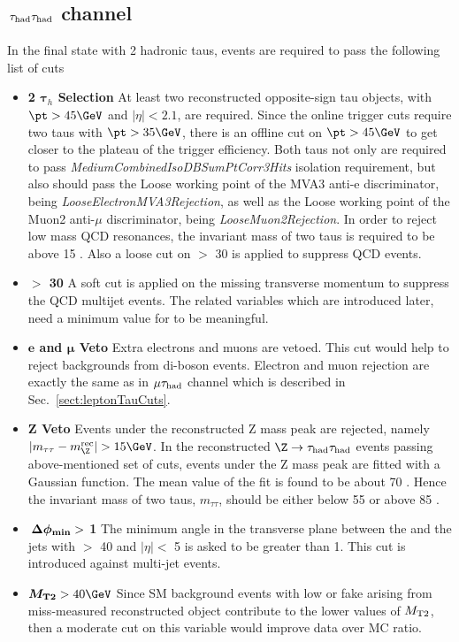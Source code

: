 \subsection{\texorpdfstring{$\,\tau_{\rm had}\tau_{\rm had}$ channel}{tau-tau channel}}
\label{sect:tauTauCuts}
In the final state with 2 hadronic taus, events are required to pass the following list of cuts
\begin{itemize}
\item \textbf{2 $\boldsymbol\tau_h$ Selection} At least two reconstructed opposite-sign tau objects, 
with $\pt>45\GeV$ and $|\eta|<2.1$, are required. Since the online trigger cuts require two taus with 
$\pt>35\GeV$, there is an offline cut on $\pt>45\GeV$ to get closer to the plateau of the trigger efficiency. 
Both taus not only are required to pass \emph{MediumCombinedIsoDBSumPtCorr3Hits} isolation requirement, 
but also should pass the Loose working point of the MVA3 anti-e discriminator, being \emph{LooseElectronMVA3Rejection}, 
as well as the Loose working point of the Muon2 anti-$\mu$ discriminator, being \emph{LooseMuon2Rejection}. 
In order to reject low mass QCD resonances, the invariant mass of two taus is required to be above 15 \GeV. Also a loose cut on \MPT $>$ 30 \GeV is applied to suppress QCD events.
\item \textbf{\MPT $>$ 30 \GeV} A soft cut is applied on the missing transverse momentum to suppress the QCD multijet events. 
The \MPT related variables which are introduced later, need a minimum value for \MPT to be meaningful. 
\item \textbf{$\boldsymbol e$ and $\boldsymbol\mu$ Veto} Extra electrons and muons are vetoed. This 
cut would help to reject backgrounds from di-boson events. Electron and muon rejection 
are exactly the same as in $\mu\tau_{\rm had}$ channel which is described in Sec.~\ref{sect:leptonTauCuts}.
\item \textbf{Z Veto} Events under the reconstructed Z mass peak are rejected, namely $|m_{\tau\tau}-m_{\Z}^{\rm rec}|>15\GeV$. 
In the reconstructed $\Z\rightarrow \Tau\Tau$ events passing above-mentioned set of cuts, events under the Z mass peak are fitted 
with a Gaussian function. The mean value of the fit is found to be about 70 \GeV. Hence the invariant mass of two taus, $m_{\tau\tau}$, should be 
either below 55 \GeV or above 85 \GeV.  
\item \textbf{$\boldsymbol{\,{\Delta\phi_{\rm min}}} > $ 1} The minimum angle in the transverse plane between the \MPT and the jets with \PT $>$ 40 \GeV and $|\eta| <$ 5 is asked to be greater than 1. This cut is introduced against multi-jet events.
\item \textbf{$\boldsymbol\mttwo>40\GeV$} Since SM background events with low \MPT or fake \MPT arising from miss-measured reconstructed object
 contribute to the lower values of ${M_{\rm T2}}$, then a moderate cut on this variable would improve data over MC ratio.  
\end{itemize}
